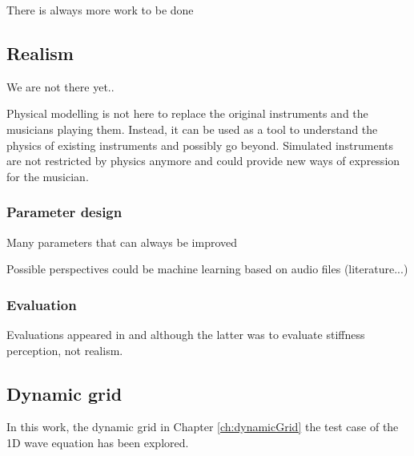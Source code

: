 There is always more work to be done

\subsection{Realism}
We are not there yet.. 

Physical modelling is not here to replace the original instruments and the musicians playing them. Instead, it can be used as a tool to understand the physics of existing instruments and possibly go beyond. Simulated instruments are not restricted by physics anymore and could provide new ways of expression for the musician. 

\subsubsection{Parameter design}
Many parameters that can always be improved

Possible perspectives could be machine learning based on audio files (literature...)

\subsubsection{Evaluation}
Evaluations appeared in \citeP[E] and \citeP[F] although the latter was to evaluate stiffness perception, not realism. 



\subsection{Dynamic grid}
In this work, the dynamic grid in Chapter \ref{ch:dynamicGrid} the test case of the 1D wave equation has been explored. 